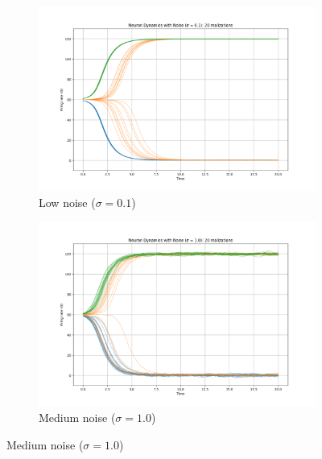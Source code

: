 \documentclass{article}
\begin{document}
\begin{figure}[H]
    \centering
    \begin{subfigure}[b]{0.48\textwidth}
        \includegraphics[width=\textwidth]{noise_strength_0.1.png}
        \caption{Low noise ($\sigma = 0.1$)}
        \label{fig:noise_low}
    \end{subfigure}
    \hfill
    \begin{subfigure}[b]{0.48\textwidth}
        \includegraphics[width=\textwidth]{noise_strength_1.0.png}
        \caption{Medium noise ($\sigma = 1.0$)}
        \label{fig:noise_medium}
    \end{subfigure}
    

\end{figure}
\end{document}
